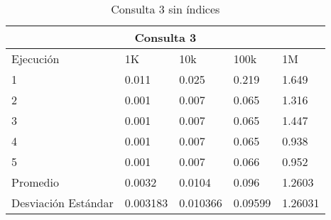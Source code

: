 \begin{table}%
\begin{center}%
\setlength{\tabcolsep}{0.3in}%
\begin{tabular}{|l|l|l|l|l|}%
\hline%
\multicolumn{5}{|c|}{Consulta 3}\\%
\hline%
Ejecución&1K&10k&100k&1M\\%
\hline%
1&0.011&0.025&0.219&1.649\\%
\hline%
2&0.001&0.007&0.065&1.316\\%
\hline%
3&0.001&0.007&0.065&1.447\\%
\hline%
4&0.001&0.007&0.065&0.938\\%
\hline%
5&0.001&0.007&0.066&0.952\\%
\hline%
Promedio&0.0032&0.0104&0.096&1.2603\\%
\hline%
Desviación Estándar&0.003183&0.010366&0.09599&1.26031\\%
\hline%
\end{tabular}%
\end{center}%
\caption{Consulta 3 sin índices}%
\end{table}